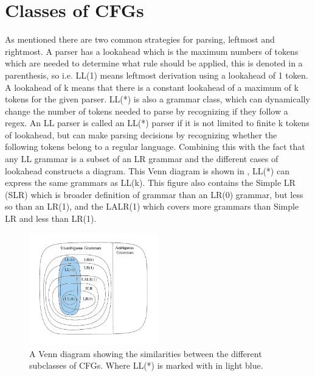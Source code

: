 \section{Classes of CFGs}
As mentioned there are two common strategies for parsing, leftmost and rightmost. 
A parser has a lookahead which is the maximum numbers of tokens which are needed to determine what rule should be applied, this is denoted in a parenthesis, so i.e. LL(1) means leftmost derivation using a lookahead of 1 token. 
A lookahead of k means that there is a constant lookahead of a maximum of k tokens for the given parser. 
LL(*) is also a grammar class, which can dynamically change the number of tokens needed to parse by recognizing if they follow a \acrlong{regex}.
An LL parser is called an LL(*) parser if it is not limited to finite k tokens of lookahead, but can make parsing decisions by recognizing whether the following tokens belong to a regular language.
Combining this with the fact that any LL grammar is a subset of an LR grammar and the different cases of lookahead constructs a diagram. 
This Venn diagram is shown in , LL(*) can express the same grammars as LL(k).
This figure also contains the Simple LR (SLR) which is broader definition of grammar than an LR(0) grammar, but less so than an LR(1), and the LALR(1) which covers more grammars than Simple LR and less than LR(1). 
\begin{figure}[!ht]
\centering
 \includegraphics[width=0.5\textwidth]{figures/classesofgrammars.png} %
\caption{A Venn diagram showing the similarities between the different subclasses of CFGs. Where LL(*) is marked with in light blue. \citep{Lecture5}}
\label{fig:hierarchyofgrammars}
\vspace{-15pt}
\end{figure}
